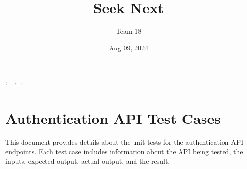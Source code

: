 \documentclass[letterpaper,10pt,english]{sphinxmanual}
\title{Seek \sphinxhyphen{} Next}
\date{Aug 09, 2024}
\author{Team 18}
\begin{document}
\ifdefined\shorthandoff
  \ifnum\catcode`\=\string=\active\shorthandoff{=}\fi
  \ifnum\catcode`\"=\active{}\fi
\fi

\pagestyle{empty}
\sphinxmaketitle
\pagestyle{plain}
\sphinxtableofcontents
\pagestyle{normal}
\label{\detokenize{src/index::doc}}


\sphinxstepscope


\chapter{Authentication API Test Cases}
\label{\detokenize{src/authTestCases:authentication-api-test-cases}}\label{\detokenize{src/authTestCases::doc}}
\sphinxAtStartPar
This document provides details about the unit tests for the authentication API endpoints. Each test case includes information about the API being tested, the inputs, expected output, actual output, and the result.


\section{}
\label{\detokenize{src/authTestCases:test-cases-for-register}}
\end{document}
